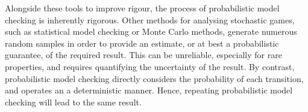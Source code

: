 Alongside these tools to improve rigour, the process of probabilistic model checking is inherently rigorous. Other methods for analysing stochastic games, such as statistical model checking or Monte Carlo methods, generate numerous random samples in order to provide an estimate, or at best a probabilistic guarantee, of the required result. This can be unreliable, especially for rare properties, and requires quantifying the uncertainty of the result. By contrast, probabilistic model checking directly considers the probability of each transition, and operates an a deterministic manner. Hence, repeating probabilistic model checking will lead to the same result.
